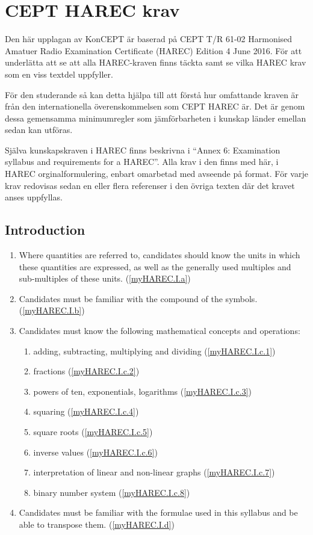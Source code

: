 \chapter{CEPT HAREC krav}

Den här upplagan av KonCEPT är baserad på CEPT T/R 61-02 Harmonised Amatuer Radio
Examination Certificate (HAREC) Edition 4 June 2016. För att underlätta att se
att alla HAREC-kraven finns täckta samt se vilka HAREC krav som en viss textdel
uppfyller.

För den studerande så kan detta hjälpa till att förstå hur omfattande kraven är
från den internationella överenskommelsen som CEPT HAREC är. Det är genom dessa
gemensamma minimumregler som jämförbarheten i kunskap länder emellan sedan kan
utföras.

Själva kunskapskraven i HAREC finns beskrivna i ``Annex 6: Examination syllabus and requirements for a HAREC''. Alla krav i den finns med här, i HAREC
orginalformulering, enbart omarbetad med avseende på format. För varje krav
redovisas sedan en eller flera referenser i den övriga texten där det kravet
anses uppfyllas.

\section{Introduction}

\renewcommand{\theenumii}{\arabic{enumii}}
\renewcommand{\labelenumii}{\theenumi.\theenumii}
\begin{enumerate}[label=\alph*.]
\item Where quantities are referred to, candidates should know the units in which these quantities are expressed, as well as the generally used multiples and sub-multiples of these units. (\ref{myHAREC.I.a})\label{HAREC.I.a}
\item Candidates must be familiar with the compound of the symbols. (\ref{myHAREC.I.b})\label{HAREC.I.b}
\item Candidates must know the following mathematical concepts and operations:
\begin{enumerate}
\item adding, subtracting, multiplying and dividing (\ref{myHAREC.I.c.1})\label{HAREC.I.c.1}
\item fractions (\ref{myHAREC.I.c.2})\label{HAREC.I.c.2}
\item powers of ten, exponentials, logarithms (\ref{myHAREC.I.c.3})\label{HAREC.I.c.3}
\item squaring (\ref{myHAREC.I.c.4})\label{HAREC.I.c.4}
\item square roots (\ref{myHAREC.I.c.5})\label{HAREC.I.c.5}
\item inverse values (\ref{myHAREC.I.c.6})\label{HAREC.I.c.6}
\item interpretation of linear and non-linear graphs (\ref{myHAREC.I.c.7})\label{HAREC.I.c.7}
\item binary number system (\ref{myHAREC.I.c.8})\label{HAREC.I.c.8}
\end{enumerate}
\item Candidates must be familiar with the formulae used in this syllabus and be able to transpose them. (\ref{myHAREC.I.d})\label{HAREC.I.d}
\end{enumerate}

